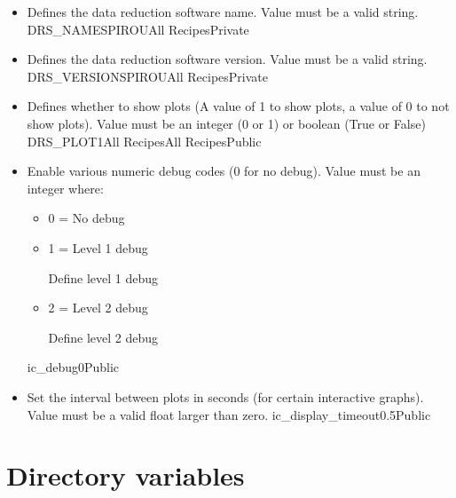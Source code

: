 \begin{itemize}
\ifdevguide
\item {}
{Defines the data reduction software name. Value must be a valid string.}
{DRS\_NAME}{SPIROU}{All Recipes}{\spirouCONST}{\spirouCONST}{Private}
\fi

\ifdevguide
\item {}
{Defines the data reduction software version. Value must be a valid string.}
{DRS\_VERSION}{SPIROU}{All Recipes}{\spirouCONST}{\spirouCONST}{Private}
\fi

\item {}
{Defines whether to show plots (A value of 1 to show plots, a value of 0 to not show plots). Value must be an integer (0 or 1) or boolean (True or False)}
{DRS\_PLOT}{1}{All Recipes}{\configtxtfile}{All Recipes}{Public}

\item {}
{Enable various numeric debug codes (0 for no debug). Value must be an integer where:
\begin{itemize}
\item 0 = No debug
\item 1 = Level 1 debug \begin{todo}Define level 1 debug\end{todo}
\item 2 = Level 2 debug \begin{todo}Define level 2 debug\end{todo}
\end{itemize}
}
{ic\_debug}{0}{\callocRAW}{\constantsfile}{}{Public}

\item {}
{Set the interval between plots in seconds (for certain interactive graphs). Value must be a valid float larger than zero.}
{ic\_display\_timeout}{0.5}{\callocRAW}{\constantsfile}{}{Public}

\end{itemize}


\section{Directory variables}
\label{ch:variables:directory}

